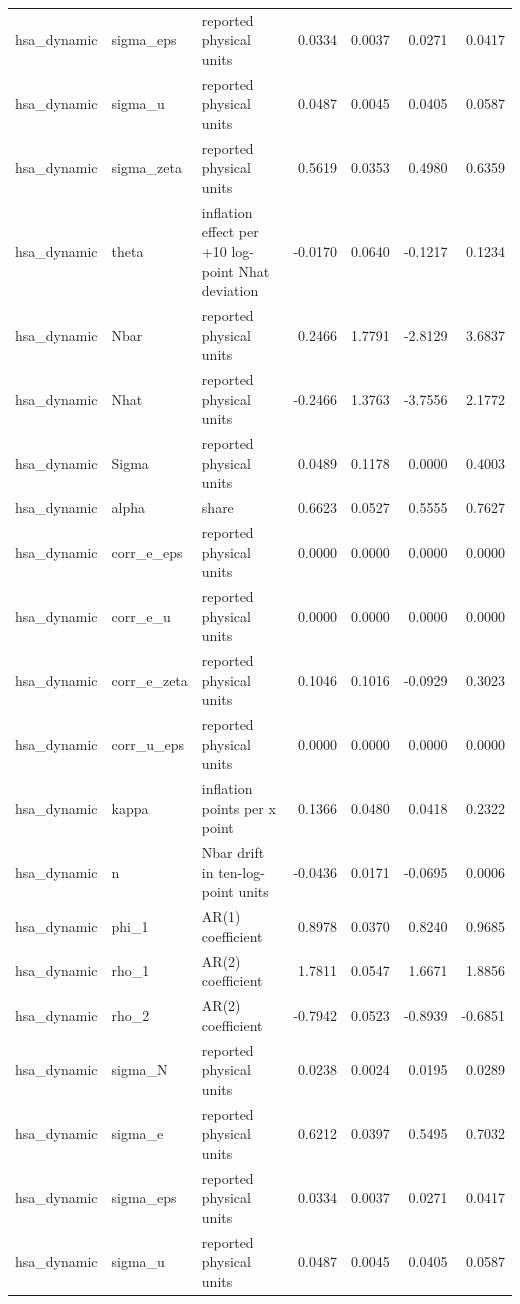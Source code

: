 \begin{tabular}{lllrrrr}
hsa\_dynamic & sigma\_eps & reported physical units & 0.0334 & 0.0037 & 0.0271 & 0.0417 \\
hsa\_dynamic & sigma\_u & reported physical units & 0.0487 & 0.0045 & 0.0405 & 0.0587 \\
hsa\_dynamic & sigma\_zeta & reported physical units & 0.5619 & 0.0353 & 0.4980 & 0.6359 \\
hsa\_dynamic & theta & inflation effect per +10 log-point Nhat deviation & -0.0170 & 0.0640 & -0.1217 & 0.1234 \\
hsa\_dynamic & Nbar & reported physical units & 0.2466 & 1.7791 & -2.8129 & 3.6837 \\
hsa\_dynamic & Nhat & reported physical units & -0.2466 & 1.3763 & -3.7556 & 2.1772 \\
hsa\_dynamic & Sigma & reported physical units & 0.0489 & 0.1178 & 0.0000 & 0.4003 \\
hsa\_dynamic & alpha & share & 0.6623 & 0.0527 & 0.5555 & 0.7627 \\
hsa\_dynamic & corr\_e\_eps & reported physical units & 0.0000 & 0.0000 & 0.0000 & 0.0000 \\
hsa\_dynamic & corr\_e\_u & reported physical units & 0.0000 & 0.0000 & 0.0000 & 0.0000 \\
hsa\_dynamic & corr\_e\_zeta & reported physical units & 0.1046 & 0.1016 & -0.0929 & 0.3023 \\
hsa\_dynamic & corr\_u\_eps & reported physical units & 0.0000 & 0.0000 & 0.0000 & 0.0000 \\
hsa\_dynamic & kappa & inflation points per x point & 0.1366 & 0.0480 & 0.0418 & 0.2322 \\
hsa\_dynamic & n & Nbar drift in ten-log-point units & -0.0436 & 0.0171 & -0.0695 & 0.0006 \\
hsa\_dynamic & phi\_1 & AR(1) coefficient & 0.8978 & 0.0370 & 0.8240 & 0.9685 \\
hsa\_dynamic & rho\_1 & AR(2) coefficient & 1.7811 & 0.0547 & 1.6671 & 1.8856 \\
hsa\_dynamic & rho\_2 & AR(2) coefficient & -0.7942 & 0.0523 & -0.8939 & -0.6851 \\
hsa\_dynamic & sigma\_N & reported physical units & 0.0238 & 0.0024 & 0.0195 & 0.0289 \\
hsa\_dynamic & sigma\_e & reported physical units & 0.6212 & 0.0397 & 0.5495 & 0.7032 \\
hsa\_dynamic & sigma\_eps & reported physical units & 0.0334 & 0.0037 & 0.0271 & 0.0417 \\
hsa\_dynamic & sigma\_u & reported physical units & 0.0487 & 0.0045 & 0.0405 & 0.0587 \\

\end{tabular}
